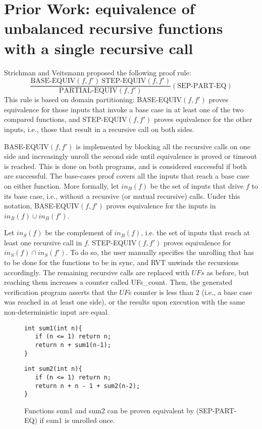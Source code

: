\section{Prior Work: equivalence of unbalanced recursive functions with a single recursive call}
\label{sec:prev}
Strichman and Veitsmann \cite{DBLP:conf/fm/StrichmanV16} proposed the following  proof rule:
\begin{equation}
 {\frac {\text{BASE-EQUIV}(f,f') \:\text{STEP-EQUIV}(f,f')}{\text{PARTIAL-EQUIV}(f,f')}} 
  (\text{SEP-PART-EQ})
\end{equation}
This rule is based on domain partitioning: BASE-EQUIV$(f,f')$ proves equivalence for those inputs that invoke a base case in at least one of the two compared functions, and STEP-EQUIV$(f,f')$ proves equivalence for the other inputs, i.e., those that result in a recursive call on both sides.

BASE-EQUIV$(f,f')$ is implemented by blocking all the recursive calls on one side and increasingly unroll the second side until equivalence is proved or timeout is reached. This is done on both programs, and is considered successful if both are successful. The base-cases proof covers all the inputs that reach a base case on either function. More formally, let $in_B(f)$ be the set of inputs that drive $f$ to its base case, i.e., without a recursive (or mutual recursive) calls. Under this notation, BASE-EQUIV$(f,f')$ proves equivalence for the  inputs in $in_B(f) \cup in_B(f')$.

Let $in_S(f)$ be the complement of $in_B(f)$, i.e. the set of inputs that reach at least one recursive call in $f$. STEP-EQUIV$(f,f')$ proves equivalence for $in_S(f) \cap in_S(f')$. To do so, the user manually specifies the unrolling that has to be done for the functions to be in sync, and RVT unwinds the recursions accordingly. The remaining recursive calls are replaced with $UFs$ as before, but reaching them increases a counter called UFs\_count. Then, the generated verification program asserts that the $UF$s counter is less than 2  (i.e., a base case was reached in at least one side), or the results upon execution with the same non-deterministic input are equal. 

\begin{figure}[h]
\begin{center}
\begin{minipage}{7 cm}
\begin{lstlisting}
int sum1(int n){
   if (n <= 1) return n;
   return n + sum1(n-1);
}
\end{lstlisting}
\end{minipage}
\begin{minipage}{7 cm}
\begin{lstlisting}
int sum2(int n){
   if (n <= 1) return n;
   return n + n - 1 + sum2(n-2);
}
\end{lstlisting}
\end{minipage}
\caption{Functions sum1 and sum2 can be proven equivalent by (SEP-PART-EQ) if sum1 is unrolled once.}
\label{fig:sum}
\end{center}
\end{figure}

